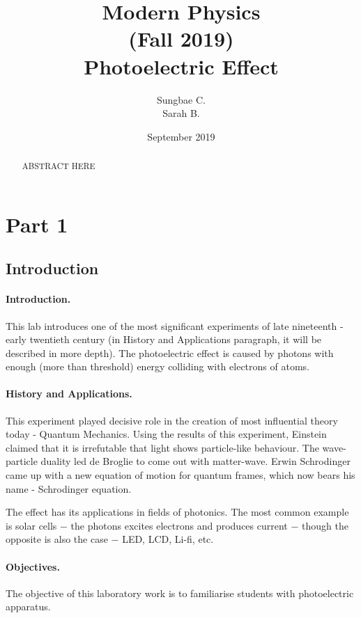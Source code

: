 \documentclass{article}
\title{Modern Physics\\(Fall 2019)\\\vspace{1cm}Photoelectric Effect}
\author{Sungbae C.\\Sarah B.}
\date{September 2019}
\begin{document}
\maketitle
\newpage

\tableofcontents
\newpage

\begin{abstract}
ABSTRACT HERE
\end{abstract}
\newpage

\section{Part 1}


\subsection{Introduction}
\paragraph{Introduction.}This lab introduces one of the most significant experiments of late nineteenth - early twentieth century (in History and Applications paragraph, it will be described in more depth). The photoelectric effect is caused by photons with enough (more than threshold) energy colliding with electrons of atoms.

\paragraph{History and Applications.} This experiment played decisive role in the creation of most influential theory today - Quantum Mechanics. Using the results of this experiment, Einstein claimed that it is irrefutable that light shows particle-like behaviour. The wave-particle duality led de Broglie to come out with matter-wave. Erwin Schrodinger came up with a new equation of motion for quantum frames, which now bears his name - Schrodinger equation.

The effect has its applications in fields of photonics. The most common example is solar cells $-$ the photons excites electrons and produces current $-$ though the opposite is also the case $-$ LED, LCD, Li-fi, etc. 

\paragraph{Objectives.}
The objective of this laboratory work is to familiarise students with photoelectric apparatus.
\newpage
\end{document}
